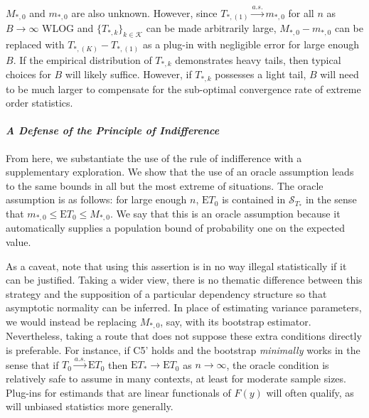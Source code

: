 \documentclass[12pt]{amsart}
\theoremstyle{plain}%
\theoremstyle{definition}
\theoremstyle{remark}
\numberwithin{equation}{section}
\begin{document}
$ M_{*, 0}$ and $m_{*, 0}$ are also unknown. However, since $T_{*, (1)} \overset{a.s.}{\to} m_{*, 0}$ for all $n$ as $B \to \infty$ WLOG and $\{ T_{*, k}\}_{k \in \mathcal{K}}$ can be made arbitrarily large, $M_{*, 0} - m_{*, 0}$ can be replaced with $T_{*, (K)} - T_{*, (1)}$ as a plug-in with negligible error for large enough $B$. If the empirical distribution of $T_{*, k}$ demonstrates heavy tails, then typical choices for $B$ will likely suffice. However, if $T_{*, k}$ possesses a light tail, $B$ will need to be much larger to compensate for the sub-optimal convergence rate of extreme order statistics.
\newline
\paragraph{\textit{A Defense of the Principle of Indifference}} From here, we substantiate the use of the rule of indifference with a supplementary exploration. We show that the use of an oracle assumption leads to the same bounds in all but the most extreme of situations. The oracle assumption is as follows: for large enough $n$, $\text{E}T_0$ is contained in $\mathcal{S}_{T_*}$ in the sense that $m_{*, 0} \leq \text{E}T_0 \leq M_{*, 0}$. We say that this is an oracle assumption because it automatically supplies a population bound of probability one on the expected value. 

As a caveat, note that using this assertion is in no way illegal statistically if it can be justified. Taking a wider view, there is no thematic difference between this strategy and the supposition of a particular dependency structure so that asymptotic normality can be inferred. In place of estimating variance parameters, we would instead be replacing $M_{*, 0}$, say, with its bootstrap estimator. Nevertheless, taking a route that does not suppose these extra conditions directly is preferable. For instance, if C5' holds and the bootstrap \textit{minimally} works in the sense that if $T_0 \overset{a.s.}{\to} \text{E}T_0$ then $\text{E}T_* \to \text{E}T_0$ as $n \to \infty$, the oracle condition is relatively safe to assume in many contexts, at least for moderate sample sizes. Plug-ins for estimands that are linear functionals of $F(y)$ will often qualify, as will unbiased statistics more generally.
\end{document}

